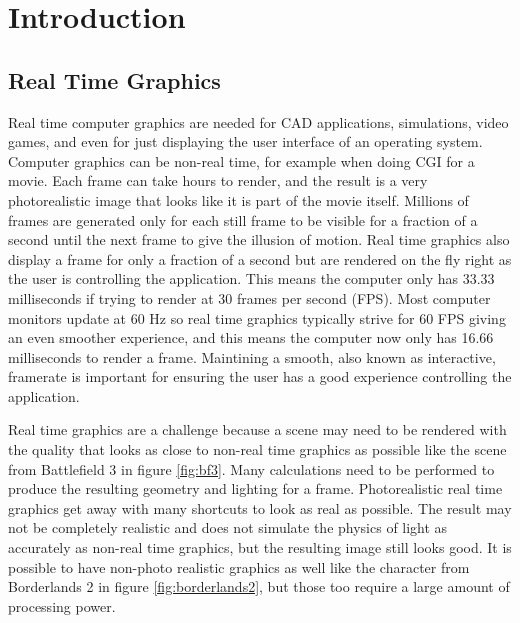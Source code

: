\documentclass[12pt]{ucthesis}
\begin{document}
\pagestyle{plain}




\renewcommand{\baselinestretch}{1.66}







\chapter{Introduction}
\label{intro}

\section{Real Time Graphics}
\label{real-time-graphics}

Real time computer graphics are needed for CAD applications, simulations, video games, and even for just displaying the user interface of an operating system.
Computer graphics can be non-real time, for example when doing CGI for a movie.
Each frame can take hours to render, and the result is a very photorealistic image that looks like it is part of the movie itself.
Millions of frames are generated only for each still frame to be visible for a fraction of a second until the next frame to give the illusion of motion.
Real time graphics also display a frame for only a fraction of a second but are rendered on the fly right as the user is controlling the application.
This means the computer only has 33.33 milliseconds if trying to render at 30 frames per second (FPS).
Most computer monitors update at 60 Hz so real time graphics typically strive for 60 FPS giving an even smoother experience, and this means the computer now only has 16.66 milliseconds to render a frame.
Maintining a smooth, also known as interactive, framerate is important for ensuring the user has a good experience controlling the application.\cite{Interactive}

Real time graphics are a challenge because a scene may need to be rendered with the quality that looks as close to non-real time graphics as possible like the scene from Battlefield 3 in figure \ref{fig:bf3}.
Many calculations need to be performed to produce the resulting geometry and lighting for a frame.
Photorealistic real time graphics get away with many shortcuts to look as real as possible.
The result may not be completely realistic and does not simulate the physics of light as accurately as non-real time graphics, but the resulting image still looks good.
It is possible to have non-photo realistic graphics as well like the character from Borderlands 2 in figure \ref{fig:borderlands2}, but those too require a large amount of processing power.
\end{document}
